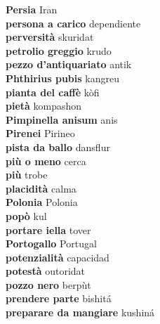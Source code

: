 \textbf{ Persia  } Iran \\
\textbf{ persona a carico  } dependiente \\
\textbf{ perversità  } skuridat \\
\textbf{ petrolio greggio  } krudo \\
\textbf{ pezzo d’antiquariato  } antik \\
\textbf{ Phthirius pubis  } kangreu \\
\textbf{ pianta del caffè  } kòfi \\
\textbf{ pietà  } kompashon \\
\textbf{ Pimpinella anisum  } anis \\
\textbf{ Pirenei  } Pirineo \\
\textbf{ pista da ballo  } dansflur \\
\textbf{ più o meno  } cerca \\
\textbf{ più  } trobe \\
\textbf{ placidità  } calma \\
\textbf{ Polonia  } Polonia \\
\textbf{ popò  } kul \\
\textbf{ portare iella  } tover \\
\textbf{ Portogallo  } Portugal \\
\textbf{ potenzialità  } capacidad \\
\textbf{ potestà  } outoridat \\
\textbf{ pozzo nero  } berpùt \\
\textbf{ prendere parte  } bishitá \\
\textbf{ preparare da mangiare  } kushiná \\
